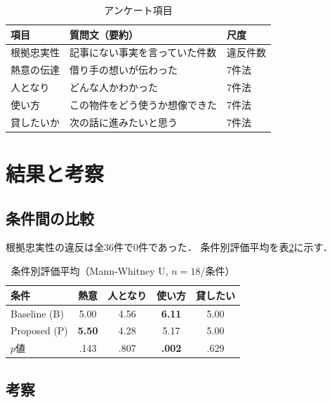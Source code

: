 \documentclass[dvipdfmx]{FITpaper}
\begin{document}
\begin{table}[h]
  \centering
  \caption{アンケート項目}
  \label{tab:survey}
  \begin{tabular}{lp{3.2cm}l}
    \toprule
    項目 & 質問文（要約） & 尺度 \\
    \midrule
    根拠忠実性 & 記事にない事実を言っていた件数 & 違反件数 \\
    熱意の伝達 & 借り手の想いが伝わった & 7件法 \\
    人となり & どんな人かわかった & 7件法 \\
    使い方 & この物件をどう使うか想像できた & 7件法 \\
    貸したいか & 次の話に進みたいと思う & 7件法 \\
    \bottomrule
  \end{tabular}
\end{table}

\section{結果と考察}

\subsection{条件間の比較}

根拠忠実性の違反は全36件で0件であった．
条件別評価平均を表\ref{tab:results_cond}に示す．

\begin{table}[h]
  \centering
  \caption{条件別評価平均（Mann-Whitney U, $n=18$/条件）}
  \label{tab:results_cond}
  \begin{tabular}{p{2.0cm}cccc}
    \toprule
    条件 & 熱意 & 人となり & 使い方 & 貸したい \\
    \midrule
    Baseline (B) & 5.00 & 4.56 & \textbf{6.11} & 5.00 \\
    Proposed (P) & \textbf{5.50} & 4.28 & 5.17 & 5.00 \\
    \midrule
    $p$値 & .143 & .807 & \textbf{.002} & .629 \\
    \bottomrule
  \end{tabular}
\end{table}

\subsection{考察}
\end{document}
